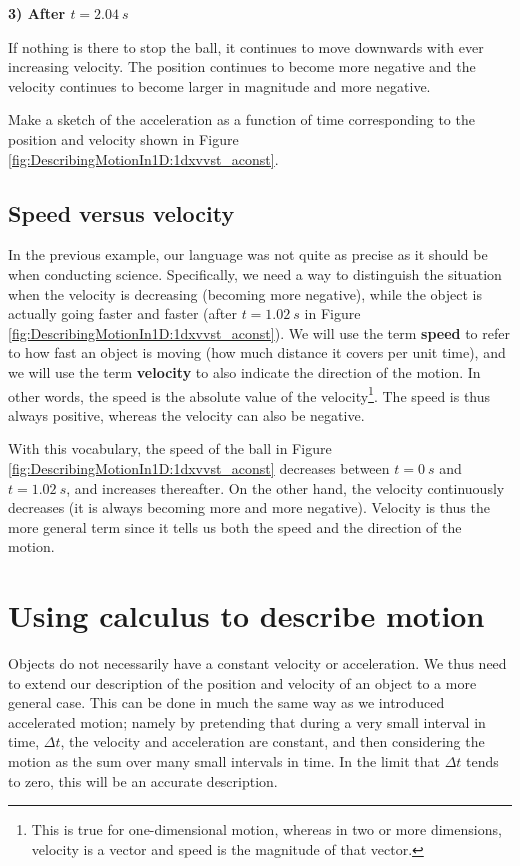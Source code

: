 \textbf{3) After $t=\SI{2.04}{s}$}

If nothing is there to stop the ball, it continues to move downwards with ever increasing velocity. The position continues to become more negative and the velocity continues to become larger in magnitude and more negative.

\begin{checkpoint}{Make a sketch of the acceleration as a function of time corresponding to the position and velocity shown in Figure \ref{fig:DescribingMotionIn1D:1dxvvst_aconst}.}
\end{checkpoint}

\subsection{Speed versus velocity}
In the previous example, our language was not quite as precise as it should be when conducting science. Specifically, we need a way to distinguish the situation when the velocity is decreasing (becoming more negative), while the object is actually going faster and faster (after $t=\SI{1.02}{s}$ in Figure \ref{fig:DescribingMotionIn1D:1dxvvst_aconst}). We will use the term \textbf{speed} to refer to how fast an object is moving (how much distance it covers per unit time), and we will use the term \textbf{velocity} to also indicate the direction of the motion. In other words, the speed is the absolute value of the velocity\footnote{This is true for one-dimensional motion, whereas in two or more dimensions, velocity is a vector and speed is the magnitude of that vector.}. The speed is thus always positive, whereas the velocity can also be negative.

With this vocabulary, the speed of the ball in Figure \ref{fig:DescribingMotionIn1D:1dxvvst_aconst} decreases between $t=\SI{0}{s}$ and $t=\SI{1.02}{s}$, and increases thereafter. On the other hand, the velocity continuously decreases (it is always becoming more and more negative). Velocity is thus the more general term since it tells us both the speed and the direction of the motion. 

\section{Using calculus to describe motion}
Objects do not necessarily have a constant velocity or acceleration. We thus need to extend our description of the position and velocity of an object to a more general case. This can be done in much the same way as we introduced accelerated motion; namely by pretending that during a very small interval in time, $\Delta t$, the velocity and acceleration are constant, and then considering the motion as the sum over many small intervals in time. In the limit that $\Delta t$ tends to zero, this will be an accurate description. 

